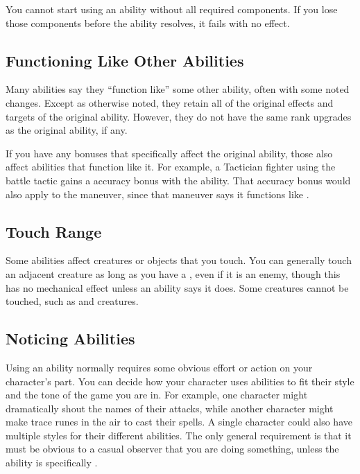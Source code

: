     You cannot start using an ability without all required components.
    If you lose those components before the ability resolves, it fails with no effect.

  \subsection{Functioning Like Other Abilities}\label{Functioning Like Other Abilities}
    Many abilities say they ``function like'' some other ability, often with some noted changes.
    Except as otherwise noted, they retain all of the original effects and targets of the original ability.
    However, they do not have the same rank upgrades as the original ability, if any.

    If you have any bonuses that specifically affect the original ability, those also affect abilities that function like it.
    For example, a Tactician fighter using the  battle tactic gains a  accuracy bonus with the  ability.
    That accuracy bonus would also apply to the  maneuver, since that maneuver says it functions like .

  \subsection{Touch Range}
    Some abilities affect creatures or objects that you touch.
    You can generally touch an adjacent creature as long as you have a , even if it is an enemy, though this has no mechanical effect unless an ability says it does.
    Some creatures cannot be touched, such as  and  creatures.

  \subsection{Noticing Abilities}
    Using an ability normally requires some obvious effort or action on your character's part.
    You can decide how your character uses abilities to fit their style and the tone of the game you are in.
    For example, one character might dramatically shout the names of their attacks, while another character might make trace runes in the air to cast their spells.
    A single character could also have multiple styles for their different abilities.
    The only general requirement is that it must be obvious to a casual observer that you are doing something, unless the ability is specifically .

